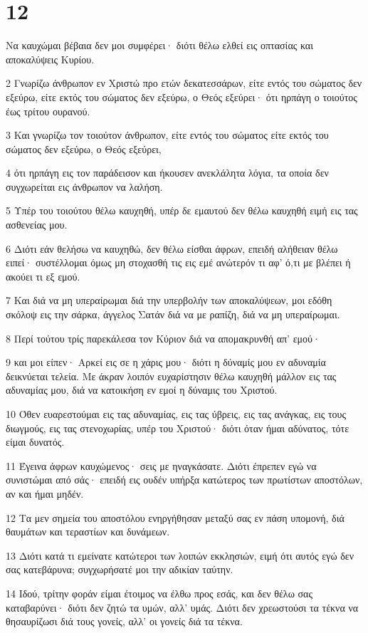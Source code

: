 \chapter{12}

\par Να καυχώμαι βέβαια δεν μοι συμφέρει· διότι θέλω ελθεί εις οπτασίας και αποκαλύψεις Κυρίου.
\par 2 Γνωρίζω άνθρωπον εν Χριστώ προ ετών δεκατεσσάρων, είτε εντός του σώματος δεν εξεύρω, είτε εκτός του σώματος δεν εξεύρω, ο Θεός εξεύρει· ότι ηρπάγη ο τοιούτος έως τρίτου ουρανού.
\par 3 Και γνωρίζω τον τοιούτον άνθρωπον, είτε εντός του σώματος είτε εκτός του σώματος δεν εξεύρω, ο Θεός εξεύρει,
\par 4 ότι ηρπάγη εις τον παράδεισον και ήκουσεν ανεκλάλητα λόγια, τα οποία δεν συγχωρείται εις άνθρωπον να λαλήση.
\par 5 Υπέρ του τοιούτου θέλω καυχηθή, υπέρ δε εμαυτού δεν θέλω καυχηθή ειμή εις τας ασθενείας μου.
\par 6 Διότι εάν θελήσω να καυχηθώ, δεν θέλω είσθαι άφρων, επειδή αλήθειαν θέλω ειπεί· συστέλλομαι όμως μη στοχασθή τις εις εμέ ανώτερόν τι αφ' ό,τι με βλέπει ή ακούει τι εξ εμού.
\par 7 Και διά να μη υπεραίρωμαι διά την υπερβολήν των αποκαλύψεων, μοι εδόθη σκόλοψ εις την σάρκα, άγγελος Σατάν διά να με ραπίζη, διά να μη υπεραίρωμαι.
\par 8 Περί τούτου τρίς παρεκάλεσα τον Κύριον διά να απομακρυνθή απ' εμού·
\par 9 και μοι είπεν· Αρκεί εις σε η χάρις μου· διότι η δύναμίς μου εν αδυναμία δεικνύεται τελεία. Με άκραν λοιπόν ευχαρίστησιν θέλω καυχηθή μάλλον εις τας αδυναμίας μου, διά να κατοικήση εν εμοί η δύναμις του Χριστού.
\par 10 Όθεν ευαρεστούμαι εις τας αδυναμίας, εις τας ύβρεις, εις τας ανάγκας, εις τους διωγμούς, εις τας στενοχωρίας, υπέρ του Χριστού· διότι όταν ήμαι αδύνατος, τότε είμαι δυνατός.
\par 11 Έγεινα άφρων καυχώμενος· σεις με ηναγκάσατε. Διότι έπρεπεν εγώ να συνιστώμαι από σάς· επειδή εις ουδέν υπήρξα κατώτερος των πρωτίστων αποστόλων, αν και ήμαι μηδέν.
\par 12 Τα μεν σημεία του αποστόλου ενηργήθησαν μεταξύ σας εν πάση υπομονή, διά θαυμάτων και τεραστίων και δυνάμεων.
\par 13 Διότι κατά τι εμείνατε κατώτεροι των λοιπών εκκλησιών, ειμή ότι αυτός εγώ δεν σας κατεβάρυνα; συγχωρήσατέ μοι την αδικίαν ταύτην.
\par 14 Ιδού, τρίτην φοράν είμαι έτοιμος να έλθω προς εσάς, και δεν θέλω σας καταβαρύνει· διότι δεν ζητώ τα υμών, αλλ' υμάς. Διότι δεν χρεωστούσι τα τέκνα να θησαυρίζωσι διά τους γονείς, αλλ' οι γονείς διά τα τέκνα.
